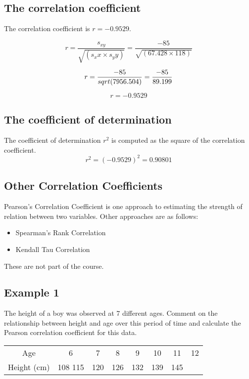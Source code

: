 \documentclass[]{report}
\begin{document}
\subsection*{The correlation coefficient}
The correlation coefficient is $r = -0.9529$.

\[ r = \frac{s_{xy}}{\sqrt{(s_xx \times s_yy)}}= \frac{-85}{\sqrt{(67.428 \times 118)}}\]

\[r= \frac{-85}{sqrt{(7956.504)}} =  {-85 \over 89.199}  \]

\[r = -0.9529\]

\subsection*{The coefficient of determination}
The coefficient of determination $r^2$ is computed as the square of the correlation coefficient.
\[r^2 = (-0.9529)^2 = 0.90801\]




\subsection{Other Correlation Coefficients}
Pearson's Correlation Coefficient is one approach to estimating the strength of relation between two variables.
Other approaches are as follows:
\begin{itemize}
	\item Spearman's Rank Correlation
	\item Kendall Tau Correlation
\end{itemize}
These are not part of the course.


\subsection{Example 1}
The height of a boy was observed at 7 different ages.
Comment on the relationship between height and age over this
period of time and calculate the Pearson correlation coefficient for
this data.

\begin{center}
	\begin{tabular}{|c|c|c|c|c|c|c|c|}
		Age  & 6 & 7  & 8 & 9 & 10 & 11 & 12 \\ 
		Height (cm)& 108 115& 120 &126& 132& 139 & 145\\
	\end{tabular} 
	
\end{center}
\end{document}

